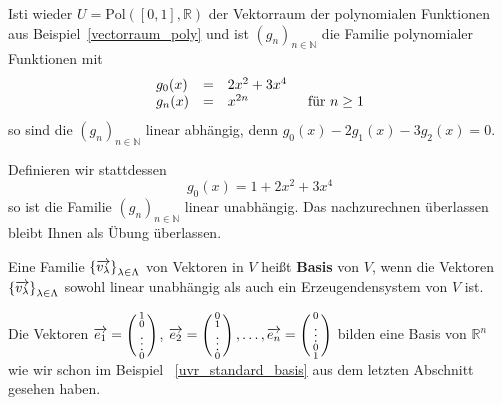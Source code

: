 \begin{beispiel} Isti wieder $U = \textrm{Pol}([0,1], \mathbb R)$ der Vektorraum der 
polynomialen Funktionen aus Beispiel~\ref{vectorraum_poly} und ist $\left( g_{n} \right)_{n \in \mathbb N}$
die Familie polynomialer Funktionen mit 
  	$$ \begin{array} {l c l l }
  	g_0(x) & = & 2 x^2 + 3 x^4 &  \\
  	g_n(x) & = & x^{2n} & \, \textrm{ für } n \geq 1 
  	\end{array} $$
so sind die $\left( g_{n} \right)_{n \in \mathbb N}$ linear abhängig, denn $g_0(x) - 2g_1(x) - 3 g_2(x) = 0$.

Definieren wir stattdessen 
  	$$ g_0(x) = 1 + 2 x^2 + 3 x^4 $$
so ist die Familie $\left( g_{n} \right)_{n \in \mathbb N}$ linear unabhängig. Das nachzurechnen überlassen 
bleibt Ihnen als Übung überlassen.
\end{beispiel}

\begin{definition} Eine Familie  $\left\{ \overrightarrow{v_{\lambda}} \right\}_{\lambda \in \Lambda}$ von 
Vektoren in $V$ heißt  \textbf{Basis} von $V$, wenn die Vektoren
$\left\{ \overrightarrow{v_{\lambda}} \right\}_{\lambda \in \Lambda}$ sowohl linear unabhängig als auch ein 
Erzeugendensystem von $V$ ist.
\end{definition}

\begin{beispiel}\label{vectorraum_standard_basis} Die Vektoren  $\overrightarrow{e_1} = 
\left( \begin{smallmatrix} 1 \\ 0 \\ \vdots \\ 0
\end{smallmatrix} \right)$, $\overrightarrow{e_2} = \left( \begin{smallmatrix} 0 \\ 1 \\ \vdots \\ 0 
\end{smallmatrix} \right), \ldots , \overrightarrow{e_n} = \left( \begin{smallmatrix} 0 \\ \vdots \\ 0 \\ 1 
\end{smallmatrix} \right)$ bilden eine Basis von $\mathbb R^n$ wie wir schon im Beispiel ~\ref{uvr_standard_basis} 
aus dem letzten Abschnitt gesehen haben. 
\end{beispiel}

